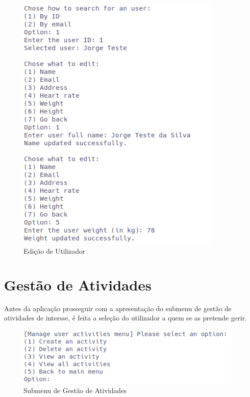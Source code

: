 \documentclass[a4paper,12pt]{scrreprt}
\begin{document}
    \begin{figure}[!ht]
        \centering
        \includegraphics[width=0.9\textwidth]{images/editUser.png}
        \caption{Edição de Utilizador}
        \label{fig:edit-user}
    \end{figure}

\clearpage
\section{Gestão de Atividades}
    \label{sec:gestao-atividades}

    Antes da aplicação prosseguir com a apresentação do submenu de gestão de atividades de intersse,
    é feita a seleção do utilizador a quem se as pretende gerir.

    \begin{figure}[!ht]
        \centering
        \includegraphics[width=\textwidth]{images/manageActivitiesSubMenu.png}
        \caption{Submenu de Gestão de Atividades}
        \label{fig:submenu-activities}
    \end{figure}
\end{document}
